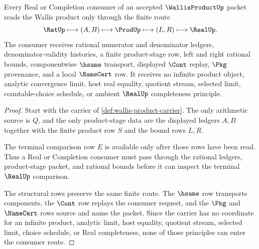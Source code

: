 \begin{theorem}
\label{thm:wallis-product-finite-bound-route}
Every Real or Completion consumer of an accepted $\WallisProductUp$ packet reads the Wallis product only through the finite route
$$
\RatUp \longmapsto (A,B) \longmapsto \ProdUp \longmapsto (L,R) \longmapsto \RealUp .
$$
The consumer receives rational numerator and denominator ledgers, denominator-validity histories, a finite product-stage row, left and right rational bounds, componentwise $\hsame$ transport, displayed $\Cont$ replay, $\Pkg$ provenance, and a local $\NameCert$ row. It receives no infinite product object, analytic convergence limit, host real equality, quotient stream, selected limit, countable-choice schedule, or ambient $\RealUp$ completeness principle.
\end{theorem}
\begin{proof}
Start with the carrier of \autoref{def:wallis-product-carrier}. The only arithmetic source is $Q$, and the only product-stage data are the displayed ledgers $A,B$ together with the finite product row $S$ and the bound rows $L,R$.

The terminal comparison row $E$ is available only after those rows have been read. Thus a Real or Completion consumer must pass through the rational ledgers, product-stage packet, and rational bounds before it can inspect the terminal $\RealUp$ comparison.

The structural rows preserve the same finite route. The $\hsame$ row transports components, the $\Cont$ row replays the consumer request, and the $\Pkg$ and $\NameCert$ rows source and name the packet. Since the carrier has no coordinate for an infinite product, analytic limit, host equality, quotient stream, selected limit, choice schedule, or Real completeness, none of those principles can enter the consumer route.
\end{proof}



